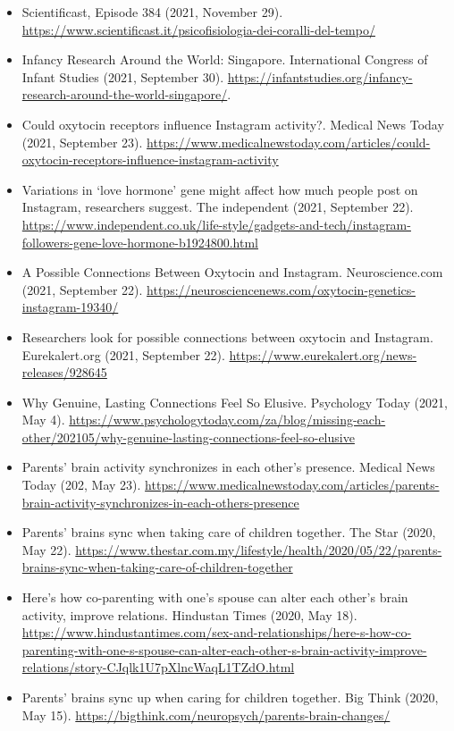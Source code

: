 \documentclass[10pt,a4paper]{altacv}
\begin{document}
\begin{fullwidth}
		\begin{itemize}
			\item Scientificast, Episode 384 (2021, November 29). \url{https://www.scientificast.it/psicofisiologia-dei-coralli-del-tempo/}
			\item Infancy Research Around the World: Singapore. International Congress of Infant Studies (2021, September 30). \url{https://infantstudies.org/infancy-research-around-the-world-singapore/}.
			\item Could oxytocin receptors influence Instagram activity?. Medical News Today (2021, September 23). \url{https://www.medicalnewstoday.com/articles/could-oxytocin-receptors-influence-instagram-activity}
			\item Variations in ‘love hormone’ gene might affect how much people post on Instagram, researchers suggest. The independent (2021, September 22). \url{https://www.independent.co.uk/life-style/gadgets-and-tech/instagram-followers-gene-love-hormone-b1924800.html}
			\item A Possible Connections Between Oxytocin and Instagram. Neuroscience.com (2021, September 22). \url{https://neurosciencenews.com/oxytocin-genetics-instagram-19340/}
			\item Researchers look for possible connections between oxytocin and Instagram. Eurekalert.org (2021, September 22). \url{https://www.eurekalert.org/news-releases/928645}
			\item Why Genuine, Lasting Connections Feel So Elusive. Psychology Today (2021, May 4). \url{https://www.psychologytoday.com/za/blog/missing-each-other/202105/why-genuine-lasting-connections-feel-so-elusive}
			\item Parents’ brain activity synchronizes in each other’s presence. Medical News Today (202, May 23). \url{https://www.medicalnewstoday.com/articles/parents-brain-activity-synchronizes-in-each-others-presence}
			\item Parents’ brains sync when taking care of children together. The Star (2020, May 22). \url{https://www.thestar.com.my/lifestyle/health/2020/05/22/parents-brains-sync-when-taking-care-of-children-together}
			\item Here’s how co-parenting with one’s spouse can alter each other’s brain activity, improve relations. Hindustan Times (2020, May 18). \url{https://www.hindustantimes.com/sex-and-relationships/here-s-how-co-parenting-with-one-s-spouse-can-alter-each-other-s-brain-activity-improve-relations/story-CJqlk1U7pXlncWaqL1TZdO.html}
			\item Parents’ brains sync up when caring for children together. Big Think (2020, May 15). \url{https://bigthink.com/neuropsych/parents-brain-changes/}

\end{itemize}
\end{fullwidth}
\end{document}
